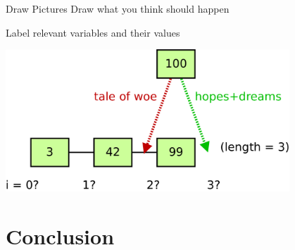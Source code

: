 \documentclass[xcolor=dvipsnames]{beamer}
\begin{document}
\begin{frame}{Draw Pictures}
	Draw what you think should happen

	Label relevant variables and their values
	\linegap

	\begin{center}
		\includegraphics[width=0.8\textwidth]{draw-a-picture.png}
	\end{center}
\end{frame}

\section{Conclusion}

\end{document}
